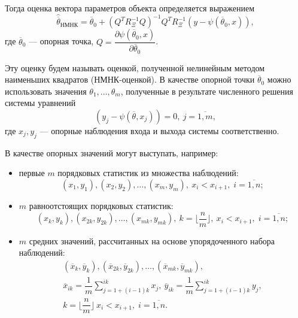 Тогда оценка вектора параметров объекта определяется выражением~\cite{mukha_2009}
\begin{equation}
  \label{eq:nonlinear_lse}
  \hat{\overline{\theta}}_{\text{НМНК}} =
  \overline{\theta}_0 + (Q^T R^{-1}_{\Xi} Q)^{-1} Q^T R^{-1}_{\Xi} (y - \psi(\overline{\theta}_0, x)),
\end{equation}
где \( \overline{\theta}_0 \) --- опорная точка,
\( Q = \dfrac{\partial \psi(\overline{\theta}_0, x) }{ \partial \overline{\theta}_0 } \).

Эту оценку будем называть оценкой, полученной нелинейным
методом наименьших квадратов (НМНК-оценкой).
В качестве опорной точки \( \overline{\theta}_0 \) можно использовать значения
\( \theta_1, \dotsc, \theta_m \),
полученные в результате численного решения системы уравнений
\begin{equation}
  \label{eq:nonlinear_basic}
  (y_j - \psi( \overline{\theta}, x_j )) = 0, \: j = \overline{1,m},
\end{equation}
где \( x_j, y_j \) --- опорные наблюдения входа и выхода системы соответственно.

В качестве опорных значений могут выступать, например:
\begin{itemize}
\item первые \( m \) порядковых статистик из множества наблюдений:
  \[
    (x_1, y_1), (x_2, y_2), \dotsc , (x_m, y_m), \:
    x_i < x_{i+1}, \;
    i = \overline{1, n};
  \]
\item \( m \) равноотстоящих порядковых статистик:
  \[
    (x_{k}, y_{k}), (x_{2k}, y_{2k}) , \dotsc , (x_{mk}, y_{mk}), \:
    k = \lfloor \dfrac{n}{m} \rfloor, \:
    x_i < x_{i+1}, \;
    i = \overline{1, n};
  \]
\item \( m \) средних значений, рассчитанных на основе
  упорядоченного набора наблюдений:
  \begin{equation}
    \begin{gathered}
      ( \overline{x}_{k}, \overline{y}_{k} ),
      ( \overline{x}_{2k}, \overline{y}_{2k} ),
      \dotsc ,
      ( \overline{x}_{mk}, \overline{y}_{mk}), \\
      \overline{x}_{ik} = \dfrac{1}{m} \sum_{j = 1+(i-1)k}^{ik} x_j, \:
      \overline{y}_{ik} = \dfrac{1}{m} \sum_{j = 1+(i-1)k}^{ik} y_j, \\
      k = \lfloor \dfrac{n}{m} \rfloor \:
      x_i < x_{i+1}, \; i = \overline{1, n}.
    \end{gathered}
    \label{eq:nonlinear_base_values}
  \end{equation}
\end{itemize}

